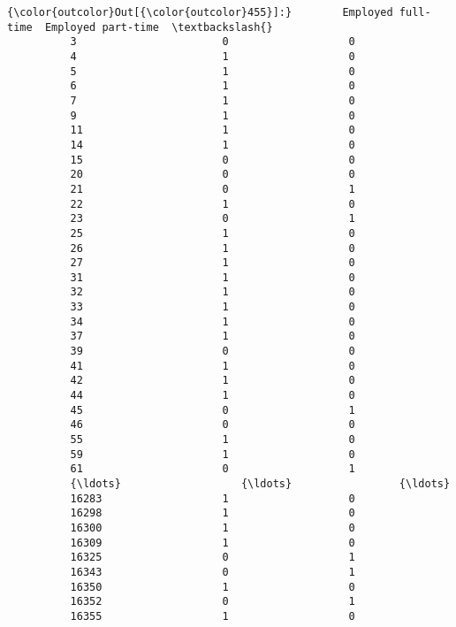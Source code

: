 \documentclass[11pt]{article}
\begin{document}
\begin{Verbatim}[commandchars=\\\{\}]
{\color{outcolor}Out[{\color{outcolor}455}]:}        Employed full-time  Employed part-time  \textbackslash{}
          3                       0                   0   
          4                       1                   0   
          5                       1                   0   
          6                       1                   0   
          7                       1                   0   
          9                       1                   0   
          11                      1                   0   
          14                      1                   0   
          15                      0                   0   
          20                      0                   0   
          21                      0                   1   
          22                      1                   0   
          23                      0                   1   
          25                      1                   0   
          26                      1                   0   
          27                      1                   0   
          31                      1                   0   
          32                      1                   0   
          33                      1                   0   
          34                      1                   0   
          37                      1                   0   
          39                      0                   0   
          41                      1                   0   
          42                      1                   0   
          44                      1                   0   
          45                      0                   1   
          46                      0                   0   
          55                      1                   0   
          59                      1                   0   
          61                      0                   1   
          {\ldots}                   {\ldots}                 {\ldots}   
          16283                   1                   0   
          16298                   1                   0   
          16300                   1                   0   
          16309                   1                   0   
          16325                   0                   1   
          16343                   0                   1   
          16350                   1                   0   
          16352                   0                   1   
          16355                   1                   0   

\end{Verbatim}
\end{document}
